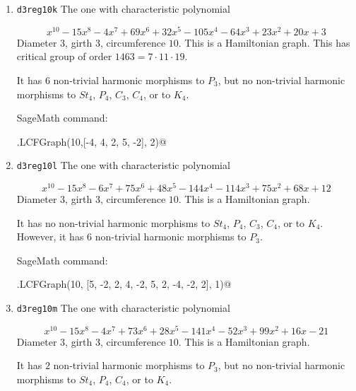 \documentclass[12pt,letterpaper]{article}
\theoremstyle{definition}
\begin{document}
\begin{enumerate}
It has $6$ non-trivial harmonic morphisms to $P_3$, but
no non-trivial harmonic morphisms to
$St_4$, $P_4$, $C_3$, $C_4$, or to $K_4$.

SageMath command:

\verb@graphs.LCFGraph(10,[3, -3, 5, -3, 2, 4, -2, 5, 3, -4], 1)@


\item
  {\tt d3reg10k}\newline
The one with %
characteristic polynomial  

\[
x^{10} - 15x^8 - 4x^7 + 69x^6 + 32x^5 - 105x^4 - 64x^3 + 23x^2 + 20x + 3 
\]
Diameter $3$,
girth $3$,
circumference $10$.
This is a Hamiltonian graph.%
This has critical group of order $1463=7\cdot 11\cdot 19$.

It has $6$ non-trivial harmonic morphisms to $P_3$, but
no non-trivial harmonic morphisms to $St_4$,
$P_4$, $C_3$, $C_4$, or to $K_4$.

SageMath command:

\verb@graphs.LCFGraph(10,[-4, 4, 2, 5, -2], 2)@


\item
  {\tt d3reg10l}\newline
The one with %
characteristic polynomial  

\[
x^{10} - 15x^8 - 6x^7 + 75x^6 + 48x^5 - 144x^4 - 114x^3 + 75x^2 + 68x + 12 
\]
Diameter $3$,
girth $3$,
circumference $10$.
This is a Hamiltonian graph.

It has no non-trivial harmonic morphisms to $St_4$, $P_4$, $C_3$, $C_4$,
or to $K_4$. However, it has $6$ non-trivial harmonic morphisms to $P_3$.

SageMath command:

\verb@graphs.LCFGraph(10, [5, -2, 2, 4, -2, 5, 2, -4, -2, 2], 1)@


\item
  {\tt d3reg10m}\newline
The one with %
characteristic polynomial  

\[
x^{10} - 15x^8 - 4x^7 + 73x^6 + 28x^5 - 141x^4 - 52x^3 + 99x^2 + 16x - 21 
\]
Diameter $3$,
girth $3$,
circumference $10$.
This is a Hamiltonian graph.%

It has $2$ non-trivial harmonic morphisms to $P_3$, but
no non-trivial harmonic morphisms to $St_4$, $P_4$, $C_4$, or to $K_4$.


\end{enumerate}
\end{document}
